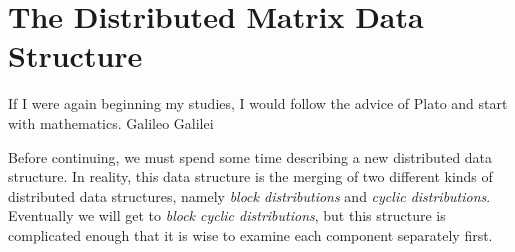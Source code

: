 \chapter[DMAT]{The Distributed Matrix Data Structure}
\label{chap:dmat}


\inspire%
{If I were again beginning my studies, I would follow the advice of Plato and start with 
mathematics.}%
{Galileo Galilei}
\vspace{0.5cm}


Before continuing, we must spend some time describing a new distributed data 
structure.  In reality, this data structure is the merging of two different 
kinds of distributed data structures, namely \emph{block distributions} and 
\emph{cyclic distributions}.  Eventually we will get to \emph{block cyclic 
distributions}, but this structure is complicated enough that it is wise to 
examine each component separately first.

